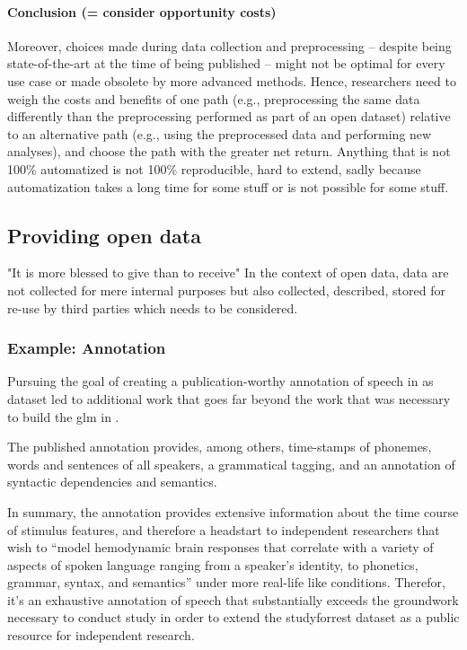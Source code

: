 \paragraph{Conclusion (= consider opportunity costs)}

Moreover, choices made during data collection and preprocessing -- despite being
state-of-the-art at the time of being published -- might not be optimal for
every use case or made obsolete by more advanced methods.
Hence, researchers need to weigh the costs and benefits of one path (e.g.,
preprocessing the same data differently than the preprocessing performed as part
of an open dataset) relative to an alternative path (e.g., using the
preprocessed data and performing new analyses), and choose the path with the
greater net return.
%
Anything that is not 100\% automatized is not 100\% reproducible, hard to
extend, sadly because automatization takes a long time for some stuff or is not
possible for some stuff.


\subsection{Providing open data}

"It is more blessed to give than to receive"
%
In the context of open data, data are not collected for mere internal purposes
but also collected, described, stored for re-use by third parties which needs to
be considered.



\subsubsection{Example: Annotation}
Pursuing the goal of creating a publication-worthy annotation of speech in
\citep{haeusler2021speechanno} as dataset led to additional work that goes far
beyond the work that was necessary to build the \ac{glm} in
\citep{haeusler2022processing}.

The published annotation provides, among others, time-stamps of phonemes, words
and sentences of all speakers, a grammatical tagging, and an annotation of
syntactic dependencies and semantics.

%
In summary, the annotation provides extensive information about the time course
of stimulus features, and therefore a headstart to independent researchers that
wish to ``model hemodynamic brain responses that correlate with a variety of
aspects of spoken language ranging from a speaker's identity, to phonetics,
grammar, syntax, and semantics'' \citep{haeusler2021speechanno} under more
real-life like conditions.
%
Therefor, it's an exhaustive annotation of speech that substantially exceeds the
groundwork necessary to conduct study \citep{haeusler2022processing} in order to
extend the studyforrest dataset as a public resource for independent research.

